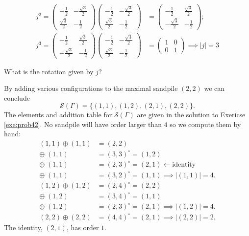 \documentclass[../algebraNotesMSRI-UP2016.tex]{subfiles}
\begin{document}
\begin{frame}
\begin{align*}
j^2=\begin{pmatrix}
	-\frac{1}{2} & -\frac{\sqrt 3}{2} \\
	\frac{\sqrt 3}{2} & -\frac{1}{2}
	\end{pmatrix}
	\begin{pmatrix}
	-\frac{1}{2} & -\frac{\sqrt 3}{2} \\
	\frac{\sqrt 3}{2} & -\frac{1}{2}
	\end{pmatrix}
	&=\begin{pmatrix}
	-\frac{1}{2} & \frac{\sqrt 3}{2}\\
	-\frac{\sqrt 3}{2} & -\frac{1}{2}
	\end{pmatrix}; \\
j^3 =\begin{pmatrix}
	-\frac{1}{2} & \frac{\sqrt 3}{2}\\
	-\frac{\sqrt 3}{2} & -\frac{1}{2}
	\end{pmatrix}
	\begin{pmatrix}
	-\frac{1}{2} & -\frac{\sqrt 3}{2} \\
	\frac{\sqrt 3}{2} & -\frac{1}{2}
	\end{pmatrix}
	&=\begin{pmatrix}
	1 & 0 \\
	0 & 1
	\end{pmatrix} \implies \boxed{|j|=3}
\end{align*}

\smallGap
\begin{que}
What is the rotation given by $j$?
\end{que}
\end{frame}
\begin{frame}
By adding various configurations to the maximal sandpile $(2,2)$ we can conclude 
\[
\mathscr S(\Gamma)=\{(1,1),(1,2),(2,1),(2,2)\}.
\]
The elements and addition table for $\mathscr S(\Gamma)$ are given in the solution to Exericse \ref{exe:prob42}.  No sandpile will have order larger than $4$ so we compute them by hand:
\begin{align*}
(1,1) \oplus (1,1) &= (2,2) \\
	\oplus \;(1,1) &= (3,3)^{\circ}=(1,2) \\
	\oplus \;(1,1) &= (2,3)^{\circ}=(2,1) \leftarrow \text{identity} \\[-0.25pc]
	\oplus \;(1,1) &= (3,2)^{\circ}=(1,1)  \implies \boxed{|(1,1)|=4}. \\
(1,2) \oplus (1,2) &= (2,4)^{\circ}=(2,2) \\
	\oplus \;(1,2) &= (3,4)^{\circ}=(1,1) \\[-0.25pc]
	\oplus \;(1,2) &= (2,3)^{\circ}=(2,1) \implies \boxed{|(1,2)|=4}. \\
(2,2) \oplus (2,2) &= (4,4)^{\circ}=(2,1) \implies \boxed{|(2,2)|=2}. 
\end{align*}
The identity, $(2,1)$, has order $1$.
\end{frame}
\end{document}
